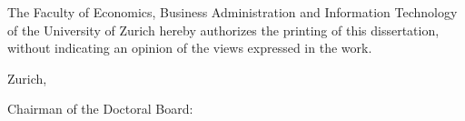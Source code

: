 \makeatletter
    \let\insertdate\@date
    \let\insertchairman\@chairman
\makeatother

\begin{titlepage}
    \begin{singlespace}
        \noindent
        The Faculty of Economics, Business Administration and Information Technology of the University of Zurich hereby authorizes the printing of this dissertation, without indicating an opinion of the views expressed in the work.
    
        \vspace{1cm}
        \noindent
        Zurich, \monthdayyeardate\insertdate
        
        \vspace{0.4cm}
        \noindent
        Chairman of the Doctoral Board: \insertchairman
    \end{singlespace}
\end{titlepage}